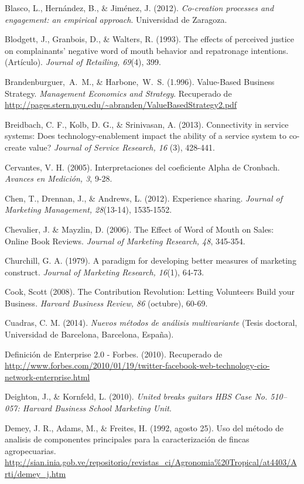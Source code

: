 \begin{thebibliography}{11}
	\bibitem{}
		Blasco, L., Hernández, B., \& Jiménez, J. (2012). \emph{Co-creation processes and engagement: an empirical approach}. Universidad de Zaragoza. 

	\bibitem{}
		Blodgett, J., Granbois, D., \& Walters, R. (1993). The effects of perceived justice on complainants' negative word of mouth behavior and repatronage intentions. (Artículo).  \emph{Journal of Retailing, 69}(4), 399.

	\bibitem{}
		Brandenburguer, A. M., \& Harbone, W. S. (1.996). Value-Based Business Strategy. \emph{Management Economics and Strategy}. Recuperado de \url{http://pages.stern.nyu.edu/~abranden/ValueBasedStrategy2.pdf}

	\bibitem{}
		Breidbach, C. F., Kolb, D. G., \& Srinivasan, A. (2013). Connectivity in service systems: Does technology-enablement impact the ability of a service system to co-create value?  \emph{Journal of Service Research, 16} (3), 428-441.

	\bibitem{}
		Cervantes, V. H. (2005). Interpretaciones del coeficiente Alpha de Cronbach.  \emph{Avances en Medición, 3}, 9-28.

	\bibitem{}
		Chen, T., Drennan, J., \& Andrews, L. (2012). Experience sharing. \emph{Journal of Marketing Management, 28}(13-14), 1535-1552.

	\bibitem{}
		Chevalier, J. \& Mayzlin, D. (2006). The Effect of Word of Mouth on Sales: Online Book Reviews.  \emph{Journal of Marketing Research, 48}, 345-354. 

	\bibitem{}
		Churchill, G. A. (1979). A paradigm for developing better measures of marketing construct. \emph{Journal of Marketing Research, 16}(1), 64-73.

	\bibitem{}
		Cook, Scott (2008). The Contribution Revolution: Letting Volunteers Build your Business. \emph{Harvard Business Review, 86} (octubre), 60-69. 	

	\bibitem{}
		Cuadras, C. M. (2014). \emph{Nuevos métodos de análisis multivariante} (Tesis doctoral, Universidad de Barcelona, Barcelona, España). 

	\bibitem{}
		Definición de Enterprise 2.0 - Forbes. (2010). Recuperado de \url{http://www.forbes.com/2010/01/19/twitter-facebook-web-technology-cio-network-enterprise.html}

	\bibitem{}
		Deighton, J.,  \& Kornfeld, L. (2010). \emph{United breaks guitars HBS Case No. 510–057: Harvard Business School Marketing Unit}.	

	\bibitem{}
		Demey, J. R., Adams, M., \& Freites, H. (1992, agosto 25). Uso del método de analisis de componentes principales para la caracterización de fincas agropecuarias. \url{http://sian.inia.gob.ve/repositorio/revistas_ci/Agronomia%20Tropical/at4403/Arti/demey_j.htm}


\end{thebibliography}
